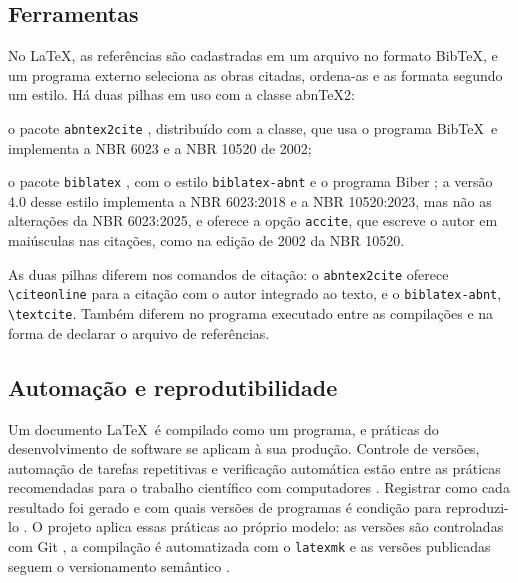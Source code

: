 \documentclass[
	article,
	12pt,
	oneside,
	a4paper,
	english,
	brazil,
]{abntex2}
\begin{document}
\subsection{Ferramentas}

No \LaTeX, as referências são cadastradas em um arquivo no formato Bib\TeX, e um programa externo seleciona as obras citadas, ordena-as e as formata segundo um estilo. Há duas pilhas em uso com a classe abn\TeX2:

\begin{alineas}
	\item o pacote \texttt{abntex2cite} \cite{abntex2cite}, distribuído com a classe, que usa o programa Bib\TeX\ e implementa a NBR 6023 e a NBR 10520 de 2002;
	\item o pacote \texttt{biblatex} \cite{biblatex}, com o estilo \texttt{biblatex-abnt} \cite{biblatexabnt} e o programa Biber \cite{biber}; a versão 4.0 desse estilo implementa a NBR 6023:2018 e a NBR 10520:2023, mas não as alterações da NBR 6023:2025, e oferece a opção \texttt{accite}, que escreve o autor em maiúsculas nas citações, como na edição de 2002 da NBR 10520.
\end{alineas}

As duas pilhas diferem nos comandos de citação: o \texttt{abntex2cite} oferece \verb|\citeonline| para a citação com o autor integrado ao texto, e o \texttt{biblatex-abnt}, \verb|\textcite|. Também diferem no programa executado entre as compilações e na forma de declarar o arquivo de referências.

\subsection{Automação e reprodutibilidade}

Um documento \LaTeX\ é compilado como um programa, e práticas do desenvolvimento de software se aplicam à sua produção. Controle de versões, automação de tarefas repetitivas e verificação automática estão entre as práticas recomendadas para o trabalho científico com computadores \cite{wilson2014,wilson2017}. Registrar como cada resultado foi gerado e com quais versões de programas é condição para reproduzi-lo \cite{sandve2013}. O projeto aplica essas práticas ao próprio modelo: as versões são controladas com Git \cite{chacon2014}, a compilação é automatizada com o \texttt{latexmk} \cite{latexmk} e as versões publicadas seguem o versionamento semântico \cite{semver}.

\end{document}
